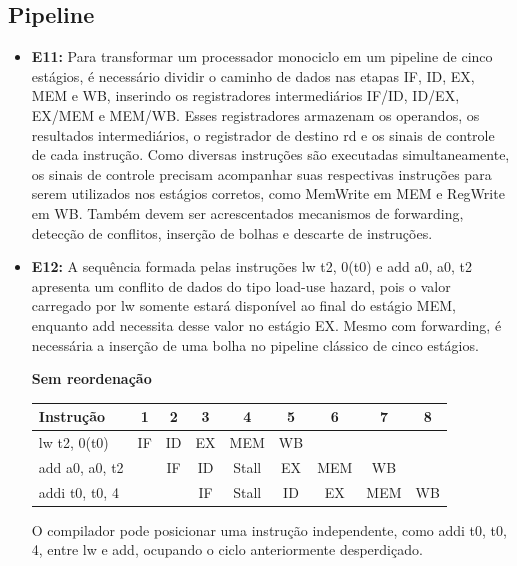 \documentclass[12pt,a4paper,titlepage]{article}
\begin{document}
\clearpage\subsection{Pipeline}
\begin{itemize}
    \item\textbf{E11:}
        Para transformar um processador monociclo em um pipeline de cinco estágios, é necessário dividir o caminho de dados
        nas etapas IF, ID, EX, MEM e WB, inserindo os registradores intermediários IF/ID, ID/EX, EX/MEM e MEM/WB.
        Esses registradores armazenam os operandos, os resultados intermediários, o registrador de destino rd e os sinais
        de controle de cada instrução. Como diversas instruções são executadas simultaneamente, os sinais de controle precisam
        acompanhar suas respectivas instruções para serem utilizados nos estágios corretos, como MemWrite em MEM e RegWrite em WB.
        Também devem ser acrescentados mecanismos de forwarding, detecção de conflitos, inserção de bolhas e descarte de instruções.

    \item\textbf{E12:}
        A sequência formada pelas instruções lw t2, 0(t0) e add a0, a0, t2 apresenta um conflito de dados do tipo load-use hazard,
        pois o valor carregado por lw somente estará disponível ao final do estágio MEM, enquanto add necessita desse valor
        no estágio EX. Mesmo com forwarding, é necessária a inserção de uma bolha no pipeline clássico de cinco estágios.

        \begin{center}
            \textbf{Sem reordenação}

            \smallskip
            \begin{tabular}{|l|*{8}{c|}}
                \hline
                Instrução & 1 & 2 & 3 & 4 & 5 & 6 & 7 & 8 \\
                \hline
                lw t2, 0(t0)    & IF & ID & EX & MEM   & WB &     &     &    \\
                add a0, a0, t2  &    & IF & ID & Stall & EX & MEM & WB  &    \\
                addi t0, t0, 4  &    &    & IF & Stall & ID & EX  & MEM & WB \\
                \hline
            \end{tabular}
        \end{center}

        O compilador pode posicionar uma instrução independente, como addi t0, t0, 4, entre lw e add, ocupando o ciclo
        anteriormente desperdiçado.


\end{itemize}
\end{document}
